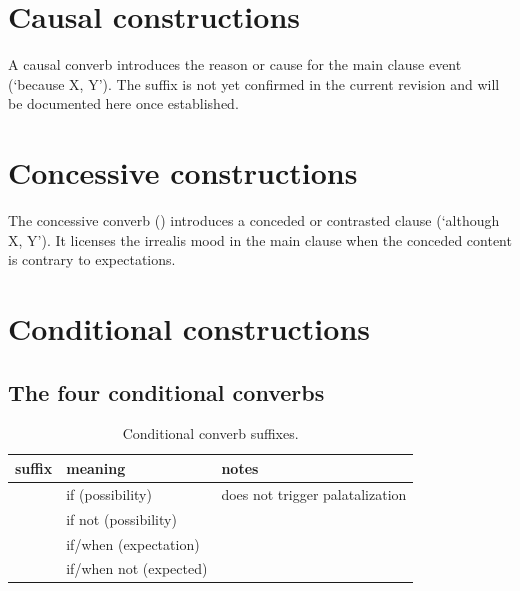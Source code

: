 \section{Causal constructions}\label{sec:causal}


A causal converb introduces the reason or cause for the main clause event (`because X, Y'). The suffix is not yet confirmed in the current revision and will be documented here once established.

\section{Concessive constructions}\label{sec:concessive}

The concessive converb () introduces a conceded or contrasted clause (`although X, Y'). It licenses the irrealis mood in the main clause when the conceded content is contrary to expectations.

\section{Conditional constructions}\label{sec:conditional}

\subsection{The four conditional converbs}

\begin{table}[ht]
	\footnotesize\sffamily
	\caption{Conditional converb suffixes.}\label{tab:conditional}
	\medskip
	\begin{tabularx}{0.8\textwidth}{L l L}
		\toprule
		{\sc suffix} & {\sc meaning} & {\sc notes} \\
		\midrule
		   & if (possibility)       & does not trigger palatalization \\
		  & if not (possibility)   & \\
		 & if/when (expectation)  & \\
		  & if/when not (expected) & \\
		\bottomrule
	\end{tabularx}
\end{table}


